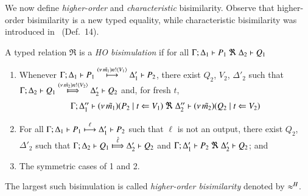 {
We now define \emph{higher-order} and \emph{characteristic} bisimilarity.
Observe that higher-order bisimilarity is a new typed equality, 
while 
characteristic bisimilarity was introduced in~\cite{characteristic_bis} (Def.~14).

\begin{definition}%
	\label{d:hbw}
	A typed relation $\Re$ is a {\em  HO bisimulation} if 
	for all $\horel{\Gamma}{\Delta_1}{P_1}{\ \Re \ }{\Delta_2}{Q_1}$ 
	\begin{enumerate}[1)]
		\item 
				Whenever 
				$\Gamma; \Delta_1 \vdash P_1 \stackrel{(\nu\, \tilde{m_1}) n ! \langle V_1 \rangle}{\longmapsto} \Delta_1' \vdash P_2$, there exist 
				$Q_2$, $V_2$, $\Delta'_2$ such that \\
				$\horel{\Gamma}{\Delta_2}{Q_1}{\Hby{\news{\tilde{m_2}} \bactout{n}{V_2}}}{\Delta_2'}{Q_2}$ and, for fresh $t$, 
%
				\[
					\begin{array}{lrlll}
						\Gamma; \Delta''_1  \vdash  {(\nu\, \tilde{m_1})(P_2 \;|\;t \Leftarrow V_1)}
						\ \Re \
						\Delta''_2 \vdash {(\nu\, \tilde{m_2})(Q_2 \;|\;t \Leftarrow V_2)}
					\end{array}
				\]

		\item	
				For all $\Gamma; \Delta_1 \vdash P_1 \stackrel{\ell}{\longmapsto} \Delta_1' \vdash P_2$ such that 
				$\ell$ is not an output, 
				 there exist $Q_2$, $\Delta'_2$ such that 
				$\horel{\Gamma}{\Delta_2}{Q_1}{\Hby{\hat{\ell}}}{\Delta_2'}{Q_2}$
				and
				$\horel{\Gamma}{\Delta_1'}{P_2}{\ \Re \ }{\Delta_2'}{Q_2}$; and 

		\item	The symmetric cases of 1 and 2.                
	\end{enumerate}
	The largest such bisimulation
	is called \emph{higher-order bisimilarity}  denoted by $\approx^H$.
\end{definition}
 



}
